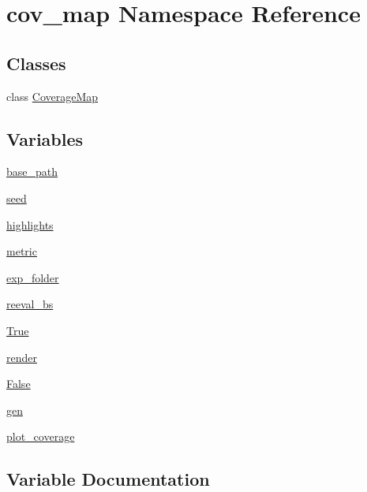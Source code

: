 \hypertarget{namespacecov__map}{}\section{cov\+\_\+map Namespace Reference}
\label{namespacecov__map}
\subsection*{Classes}
\begin{DoxyCompactItemize}
\item 
class \hyperlink{classcov__map_1_1_coverage_map}{Coverage\+Map}
\end{DoxyCompactItemize}
\subsection*{Variables}
\begin{DoxyCompactItemize}
\item 
\hyperlink{namespacecov__map_a2055d511d41e4f377120be005720b73d}{base\+\_\+path}
\item 
\hyperlink{namespacecov__map_a2b2c04ce9049e2317523d00af491d5d6}{seed}
\item 
\hyperlink{namespacecov__map_ae1cf0882e67e4f554cd94304a56fb55e}{highlights}
\item 
\hyperlink{namespacecov__map_ada8d6aef02a91d126d8a1942fa619075}{metric}
\item 
\hyperlink{namespacecov__map_a6abf1f7b9a34fd9cdd53083bf0590d44}{exp\+\_\+folder}
\item 
\hyperlink{namespacecov__map_a235b7a7698a61a555e6d21ea7649f87c}{reeval\+\_\+bs}
\item 
\hyperlink{namespacecov__map_a3c03983c9333ef2283ff567f15beadeb}{True}
\item 
\hyperlink{namespacecov__map_a1e289e3c9d61b6dcadc52f55a2f37d4b}{render}
\item 
\hyperlink{namespacecov__map_af3d7cb622261ac223785ce49937d4e20}{False}
\item 
\hyperlink{namespacecov__map_a27d29e4b7835e4d69f6c88ece0ab78db}{gen}
\item 
\hyperlink{namespacecov__map_a01011b7e6ed59223d9c57f074eb23d9c}{plot\+\_\+coverage}
\end{DoxyCompactItemize}


\subsection{Variable Documentation}
